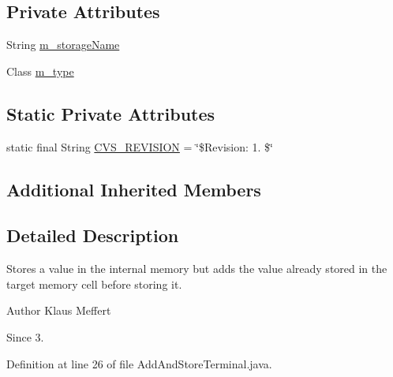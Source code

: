 \subsection*{Private Attributes}
\begin{DoxyCompactItemize}
\item 
String \hyperlink{classorg_1_1jgap_1_1gp_1_1function_1_1_add_and_store_terminal_ad4d924dec40c6808079bba21c2ce7109}{m\-\_\-storage\-Name}
\item 
Class \hyperlink{classorg_1_1jgap_1_1gp_1_1function_1_1_add_and_store_terminal_a4cdce43124d31812835c2e936c5f2811}{m\-\_\-type}
\end{DoxyCompactItemize}
\subsection*{Static Private Attributes}
\begin{DoxyCompactItemize}
\item 
static final String \hyperlink{classorg_1_1jgap_1_1gp_1_1function_1_1_add_and_store_terminal_add1d1d7649a010682468ac5adf7e3d6e}{C\-V\-S\-\_\-\-R\-E\-V\-I\-S\-I\-O\-N} = \char`\"{}\$Revision\-: 1. \$\char`\"{}
\end{DoxyCompactItemize}
\subsection*{Additional Inherited Members}


\subsection{Detailed Description}
Stores a value in the internal memory but adds the value already stored in the target memory cell before storing it.

\begin{DoxyAuthor}{Author}
Klaus Meffert 
\end{DoxyAuthor}
\begin{DoxySince}{Since}
3. 
\end{DoxySince}


Definition at line 26 of file Add\-And\-Store\-Terminal.\-java.



